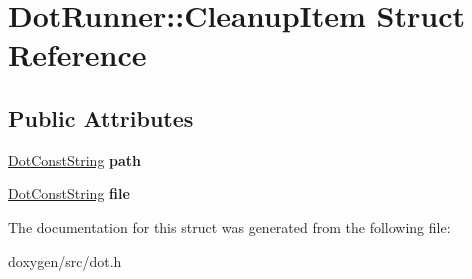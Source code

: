 \hypertarget{struct_dot_runner_1_1_cleanup_item}{}\section{Dot\+Runner\+::Cleanup\+Item Struct Reference}
\label{struct_dot_runner_1_1_cleanup_item}
\subsection*{Public Attributes}
\begin{DoxyCompactItemize}
\item 
\mbox{\label{struct_dot_runner_1_1_cleanup_item_a8d5cf206592954e90d5879f89cfe703f}} 
\mbox{\hyperlink{class_dot_const_string}{Dot\+Const\+String}} {\bfseries path}
\item 
\mbox{\label{struct_dot_runner_1_1_cleanup_item_a138831aeb01a905b68f8a08499261bdf}} 
\mbox{\hyperlink{class_dot_const_string}{Dot\+Const\+String}} {\bfseries file}
\end{DoxyCompactItemize}


The documentation for this struct was generated from the following file\+:\begin{DoxyCompactItemize}
\item 
doxygen/src/dot.\+h\end{DoxyCompactItemize}

